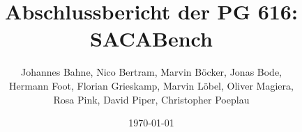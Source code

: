 \title{Abschlussbericht der PG 616: SACABench}
\author{Johannes Bahne, 
Nico Bertram,
Marvin Böcker,
Jonas Bode,\\
Hermann Foot,
Florian Grieskamp,
Marvin Löbel,
Oliver Magiera,\\
Rosa Pink,
David Piper,
Christopher Poeplau}
\date{\today}

\maketitle